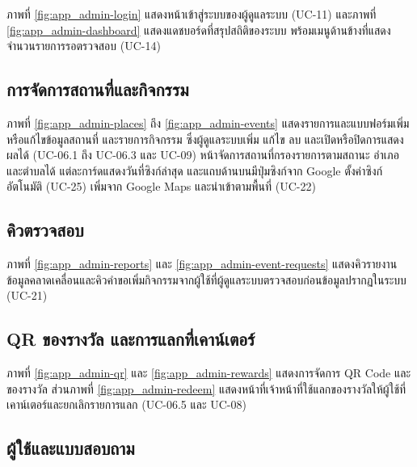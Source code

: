 ภาพที่ \ref{fig:app_admin-login} แสดงหน้าเข้าสู่ระบบของผู้ดูแลระบบ (UC-11) และภาพที่ \ref{fig:app_admin-dashboard} แสดงแดชบอร์ดที่สรุปสถิติของระบบ พร้อมเมนูด้านข้างที่แสดงจำนวนรายการรอตรวจสอบ (UC-14)


\subsection{การจัดการสถานที่และกิจกรรม}

ภาพที่ \ref{fig:app_admin-places} ถึง \ref{fig:app_admin-events} แสดงรายการและแบบฟอร์มเพิ่มหรือแก้ไขข้อมูลสถานที่ และรายการกิจกรรม ซึ่งผู้ดูแลระบบเพิ่ม แก้ไข ลบ และเปิดหรือปิดการแสดงผลได้ (UC-06.1 ถึง UC-06.3 และ UC-09) หน้าจัดการสถานที่กรองรายการตามสถานะ อำเภอ และตำบลได้ แต่ละการ์ดแสดงวันที่ซิงก์ล่าสุด และแถบด้านบนมีปุ่มซิงก์จาก Google ตั้งค่าซิงก์อัตโนมัติ (UC-25) เพิ่มจาก Google Maps และนำเข้าตามพื้นที่ (UC-22)


\subsection{คิวตรวจสอบ}

ภาพที่ \ref{fig:app_admin-reports} และ \ref{fig:app_admin-event-requests} แสดงคิวรายงานข้อมูลคลาดเคลื่อนและคิวคำขอเพิ่มกิจกรรมจากผู้ใช้ที่ผู้ดูแลระบบตรวจสอบก่อนข้อมูลปรากฏในระบบ (UC-21)


\subsection{QR ของรางวัล และการแลกที่เคาน์เตอร์}

ภาพที่ \ref{fig:app_admin-qr} และ \ref{fig:app_admin-rewards} แสดงการจัดการ QR Code และของรางวัล ส่วนภาพที่ \ref{fig:app_admin-redeem} แสดงหน้าที่เจ้าหน้าที่ใช้แลกของรางวัลให้ผู้ใช้ที่เคาน์เตอร์และยกเลิกรายการแลก (UC-06.5 และ UC-08)


\subsection{ผู้ใช้และแบบสอบถาม}

